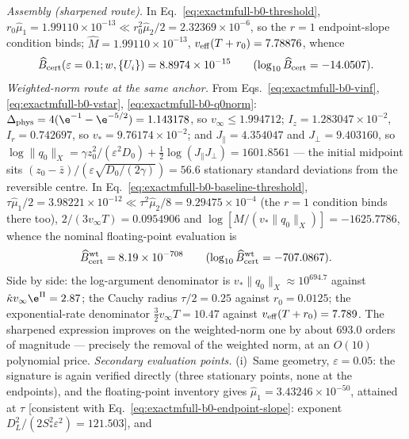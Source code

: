 \begin{remark}
\emph{Assembly (sharpened route).}  In
Eq.~\eqref{eq:exactmfull-b0-threshold},
\(r_0\widehat\mu_1=1.99110\times10^{-13}
\ll r_0^2\widehat\mu_2/2=2.32369\times10^{-6}\),
so the \(r=1\) endpoint-slope condition binds;
\(\widehat M=1.99110\times10^{-13}\),
\(v_{\rm eff}(T+r_0)=7.78876\), whence
\begin{equation}
 \widehat B_{\rm cert}(\varepsilon=0.1;w,\{U_i\})
 =8.8974\times10^{-15}
 \qquad(\log_{10}\widehat B_{\rm cert}=-14.0507).
 \label{eq:exactmfull-b0-anchor-value}
\end{equation}
\emph{Weighted-norm route at the same anchor.}  From
Eqs.~\eqref{eq:exactmfull-b0-vinf}, \eqref{eq:exactmfull-b0-vstar},
\eqref{eq:exactmfull-b0-q0norm}:
\(\Delta_{\rm phys}=4(\e^{-1}-\e^{-5/2})=1.143178\), so
\(v_\infty\le1.994712\); \(I_z=1.283047\times10^{-2}\),
\(I_r=0.742697\), so \(v_*=9.76174\times10^{-2}\); and
\(J_\parallel=4.354047\) and \(J_\perp=9.403160\), so
\(\log\|q_0\|_X=\gamma z_0^2/(\varepsilon^2D_0)
+\tfrac12\log(J_\parallel J_\perp)=1601.8561\) --- the initial midpoint sits
\((z_0-\bar z)/(\varepsilon\sqrt{D_0/(2\gamma)})=56.6\) stationary standard
deviations from the reversible centre.  In
Eq.~\eqref{eq:exactmfull-b0-baseline-threshold},
\(\tau\widehat\mu_1/2=3.98221\times10^{-12}
\ll\tau^2\widehat\mu_2/8=9.29475\times10^{-4}\)
(the \(r=1\) condition binds there too),
\(2/(3v_\infty T)=0.0954906\) and
\(\log[M/(v_*\|q_0\|_X)]=-1625.7786\), whence the nominal
floating-point evaluation is
\begin{equation}
 \widehat B_{\rm cert}^{\rm wt}=8.19\times10^{-708}
 \qquad(\log_{10}\widehat B_{\rm cert}^{\rm wt}=-707.0867).
 \label{eq:exactmfull-b0-baseline-anchor}
\end{equation}
Side by side: the log-argument denominator is
\(v_*\|q_0\|_X\approx10^{694.7}\) against
\(\hat\kappa v_\infty\e^{\Pi}=2.87\); the Cauchy radius \(\tau/2=0.25\)
against \(r_0=0.0125\); the exponential-rate denominator
\(\tfrac32v_\infty T=10.47\) against \(v_{\rm eff}(T+r_0)=7.789\).  The
sharpened expression improves on the weighted-norm one by about \(693.0\) orders
of magnitude --- precisely the removal of the weighted norm, at an
\(O(10)\) polynomial price.
\emph{Secondary evaluation points.}  (i)~Same geometry, \(\varepsilon=0.05\):
the signature is again verified directly (three stationary points, none at
the endpoints), and the floating-point inventory gives
\(\widehat\mu_1=3.43246\times10^{-50}\), attained at \(\tau\) [consistent with
Eq.~\eqref{eq:exactmfull-b0-endpoint-slope}: exponent
\(D_L^2/(2S_*^2\varepsilon^2)=121.503\)], and

\end{remark}
